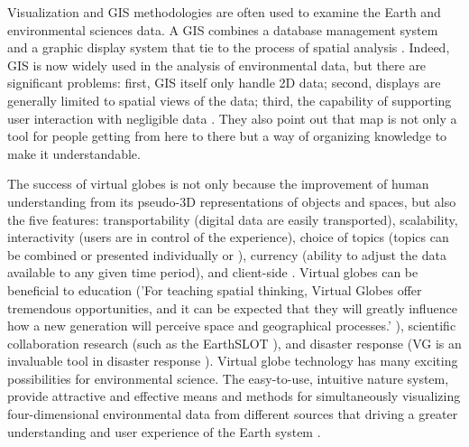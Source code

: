 Visualization and GIS methodologies are often used to examine the Earth and environmental sciences data. A GIS combines a database management system and a graphic display system that tie to the process of spatial analysis \cite{rhyne.visualization-gis.1994, rhyne.virtual.1997}. Indeed, GIS is now widely used in the analysis of environmental data, but there are significant problems: first, GIS itself only handle 2D data; second, displays are generally limited to spatial views of the data; third, the capability of supporting user interaction with  negligible data \cite{rhyne.visualization-gis.1994}. They also point out that map is not only a tool for people getting from here to there but a way of organizing knowledge to make it understandable.

The success of virtual globes \cite{tuttle.virtual-globes.2008} is not only because the improvement of human understanding from its pseudo-3D representations of objects and spaces, but also the five features: transportability (digital data are easily transported), scalability, interactivity (users are in control of the experience), choice of topics (topics can be combined or presented individually or ), currency (ability to adjust the data available to any given time period), and client-side \cite{tuttle.virtual-globes.2008}. Virtual globes can be beneficial to education ('For teaching spatial thinking, Virtual Globes offer tremendous opportunities, and it can be expected that they will greatly influence how a new generation will perceive space and geographical processes.' \cite{nuernberger.vr-classroom.2006}), scientific collaboration research (such as the EarthSLOT \cite{earthslot.2016}), and disaster response (VG is an invaluable tool in disaster response \cite{butler.vg.2006, nourbakhsh.mapping-disaster-zones.2006}). Virtual globe technology has many exciting possibilities for environmental science. The easy-to-use, intuitive nature system, provide attractive and effective means and methods for simultaneously visualizing four-dimensional environmental data from different sources that driving a greater understanding and user experience of the Earth system \cite{blower.sharing-visualizing.2007}. 

